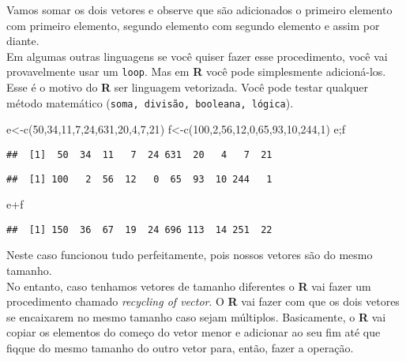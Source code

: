 \documentclass[
]{book}
\newenvironment{Shaded}{\begin{snugshade}}{\end{snugshade}}
\newcommand{\DecValTok}[1]{\textcolor[rgb]{0.00,0.00,0.81}{#1}}
\newcommand{\FunctionTok}[1]{\textcolor[rgb]{0.00,0.00,0.00}{#1}}
\newcommand{\NormalTok}[1]{#1}
\newcommand{\OtherTok}[1]{\textcolor[rgb]{0.56,0.35,0.01}{#1}}
\newcommand{\SpecialCharTok}[1]{\textcolor[rgb]{0.00,0.00,0.00}{#1}}
\begin{document}
Vamos somar os dois vetores e observe que são adicionados o primeiro elemento com primeiro elemento, segundo elemento com segundo elemento e assim por diante.\\
Em algumas outras linguagens se você quiser fazer esse procedimento, você vai provavelmente usar um \texttt{loop}. Mas em \textbf{R} você pode simplesmente adicioná-los. Esse é o motivo do \textbf{R} ser linguagem vetorizada. Você pode testar qualquer método matemático (\texttt{soma,\ divisão,\ booleana,\ lógica}).

\begin{Shaded}
\begin{Highlighting}[]
\NormalTok{e}\OtherTok{\textless{}{-}}\FunctionTok{c}\NormalTok{(}\DecValTok{50}\NormalTok{,}\DecValTok{34}\NormalTok{,}\DecValTok{11}\NormalTok{,}\DecValTok{7}\NormalTok{,}\DecValTok{24}\NormalTok{,}\DecValTok{631}\NormalTok{,}\DecValTok{20}\NormalTok{,}\DecValTok{4}\NormalTok{,}\DecValTok{7}\NormalTok{,}\DecValTok{21}\NormalTok{)}
\NormalTok{f}\OtherTok{\textless{}{-}}\FunctionTok{c}\NormalTok{(}\DecValTok{100}\NormalTok{,}\DecValTok{2}\NormalTok{,}\DecValTok{56}\NormalTok{,}\DecValTok{12}\NormalTok{,}\DecValTok{0}\NormalTok{,}\DecValTok{65}\NormalTok{,}\DecValTok{93}\NormalTok{,}\DecValTok{10}\NormalTok{,}\DecValTok{244}\NormalTok{,}\DecValTok{1}\NormalTok{)}
\NormalTok{e;f}
\end{Highlighting}
\end{Shaded}

\begin{verbatim}
##  [1]  50  34  11   7  24 631  20   4   7  21
\end{verbatim}

\begin{verbatim}
##  [1] 100   2  56  12   0  65  93  10 244   1
\end{verbatim}

\begin{Shaded}
\begin{Highlighting}[]
\NormalTok{e}\SpecialCharTok{+}\NormalTok{f}
\end{Highlighting}
\end{Shaded}

\begin{verbatim}
##  [1] 150  36  67  19  24 696 113  14 251  22
\end{verbatim}

Neste caso funcionou tudo perfeitamente, pois nossos vetores são do mesmo tamanho.\\
No entanto, caso tenhamos vetores de tamanho diferentes o \textbf{R} vai fazer um procedimento chamado \emph{\emph{recycling of vector}}. O \textbf{R} vai fazer com que os dois vetores se encaixarem no mesmo tamanho caso sejam múltiplos. Basicamente, o \textbf{R} vai copiar os elementos do começo do vetor menor e adicionar ao seu fim até que fiqque do mesmo tamanho do outro vetor para, então, fazer a operação.
\end{document}
